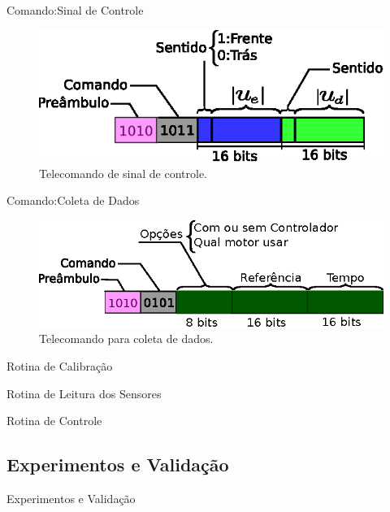 \begin{frame}{Comando:Sinal de Controle}
    \begin{figure}
        \centering
        \includegraphics[width=\textwidth]{figuras/ilustracoes/ilustracao_comando_sinal_de_controle.eps}
        \caption{Telecomando de sinal de controle.}
    \end{figure}
\end{frame}

\begin{frame}{Comando:Coleta de Dados}
    \begin{figure}
        \centering
        \includegraphics[width=\textwidth]{figuras/ilustracoes/ilustracao_comando_coleta_de_dados.eps}
        \caption{Telecomando para coleta de dados.}
    \end{figure}
\end{frame}

\begin{frame}{Rotina de Calibração}
    
\end{frame}

\begin{frame}{Rotina de Leitura dos Sensores}
    
\end{frame}

\begin{frame}{Rotina de Controle}
    
\end{frame}

\subsection{Experimentos e Validação}
\begin{frame}{Experimentos e Validação}
    
\end{frame}

